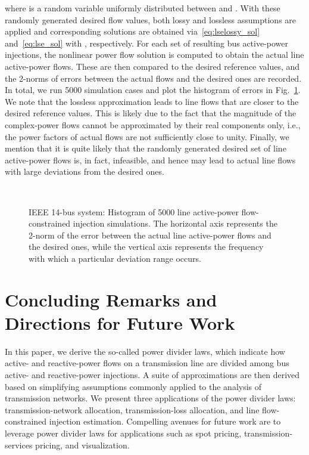 \documentclass[journal]{IEEEtran}
\theoremstyle{definition}
\begin{document}
where  is a random variable uniformly distributed between  and .  With these randomly generated desired flow values, both lossy and lossless assumptions are applied and corresponding solutions are obtained via~\eqref{eq:lselossy_sol} and~\eqref{eq:lse_sol} with , respectively.  For each set of resulting bus active-power injections, the nonlinear power flow solution is computed to obtain the actual line active-power flows.  These are then compared to the desired reference values, and the 2-norms of errors between the actual flows and the desired ones are recorded.  In total, we run 5000 simulation cases and plot the histogram of errors in Fig.~\ref{fig:loadability}.  We note that the lossless approximation leads to line flows that are closer to the desired reference values.  This is likely due to the fact that the magnitude of the complex-power flows cannot be approximated by their real components only, i.e., the power factors of actual flows are not sufficiently close to unity.  Finally, we mention that it is quite likely that the randomly generated desired set of line active-power flows is, in fact, infeasible, and hence may lead to actual line flows with large deviations from the desired ones.

\begin{figure}[t!]
\centering
\mbox{
}
\caption{IEEE 14-bus system: Histogram of 5000 line active-power flow-constrained injection simulations. The horizontal axis represents the 2-norm of the error between the actual line active-power flows and the desired ones, while the vertical axis represents the frequency with which a particular deviation range occurs.}
\label{fig:loadability}
\end{figure}

\section{Concluding Remarks and Directions for Future Work}
\label{sec:conc}

In this paper, we derive the so-called power divider laws, which indicate how active- and reactive-power flows on a transmission line are divided among bus active- and reactive-power injections.  A suite of approximations are then derived based on simplifying assumptions commonly applied to the analysis of transmission networks. We present three applications of the power divider laws: transmission-network allocation, transmission-loss allocation, and line flow-constrained injection estimation. Compelling avenues for future work are to leverage power divider laws for applications such as spot pricing, transmission-services pricing, and visualization.
\balance




\end{document}
